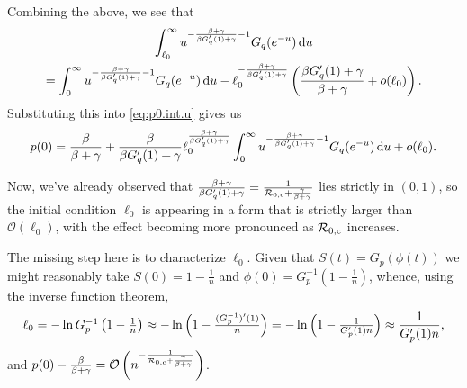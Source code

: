 \documentclass[11pt]{article}
\newcommand{\R}{\mathcal{R}}
\newcommand{\Rzeroc}{\R_{\rm 0,c}}
\newcommand{\dee}{{\rm d}}
\newcommand{\Oh}{\mathcal{O}}
\begin{document}
Combining the above, we see that
\begin{multline}
	\int_{\ell_{0}}^{\infty} u^{-\frac{\beta+\gamma}{\beta G_{q}'(1)+\gamma}-1} G_{q}(e^{-u})\, \dee u\\
	= \int_{0}^{\infty} u^{-\frac{\beta+\gamma}{\beta G_{q}'(1)+\gamma}-1} G_{q}(e^{-u})\, \dee u 
		- \ell_{0}^{-\frac{\beta+\gamma}{\beta G_{q}'(1)+\gamma}}\left(\frac{\beta G_{q}'(1)+\gamma}{\beta+\gamma} + o(\ell_{0})\right).
\end{multline}
Substituting this into \eqref{eq:p0.int.u} gives us
\begin{equation}
	p(0) = \frac{\beta}{\beta+\gamma} + \frac{\beta}{\beta G_{q}'(1)+\gamma} \ell_{0}^{\frac{\beta+\gamma}{\beta G_{q}'(1)+\gamma}}
		\int_{0}^{\infty} u^{-\frac{\beta+\gamma}{\beta G_{q}'(1)+\gamma}-1} G_{q}(e^{-u})\, \dee u + o(\ell_{0}).
\end{equation}

Now, we've already observed that $\frac{\beta+\gamma}{\beta G_{q}'(1)+\gamma} = \frac{1}{\Rzeroc + \frac{\gamma}{\beta+\gamma}}$ lies strictly in $(0,1)$, so the initial condition $\ell_{0}$ is appearing in a form that is strictly larger than $\Oh(\ell_{0})$, with the effect becoming more pronounced as $\Rzeroc$ increases.

The missing step here is to characterize $\ell_{0}$. Given that $S(t) = G_{p}(\phi(t))$ we might reasonably take $S(0) = 1-\frac{1}{n}$ and $\phi(0) =  G_{p}^{-1}\left(1-\frac{1}{n}\right)$, whence, using the inverse function theorem, 
\begin{equation}
	\ell_{0} = - \ln {\textstyle G_{p}^{-1}\left(1-\frac{1}{n}\right)}
	\approx - \ln {\textstyle\left(1-\frac{(G_{p}^{-1})'(1)}{n}\right)}
	= - \ln {\textstyle\left(1-\frac{1}{G_{p}'(1) n}\right)}\\
	\approx  \frac{1}{G_{p}'(1) n},
\end{equation}
and $p(0) - \frac{\beta}{\beta+\gamma} = \Oh\left(n^{-\frac{1}{\Rzeroc + \frac{\gamma}{\beta+\gamma}}}\right)$.
\end{document}
